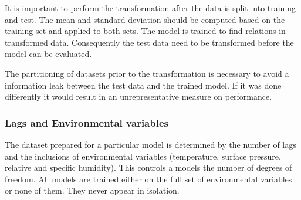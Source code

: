 It is important to perform the transformation after the data is split into training and test. The mean and standard deviation should be computed based on the training set and applied to both sets. The model is trained to find relations in transformed data. Consequently the test data need to be transformed before the model can be evaluated. 

The partitioning of datasets prior to the transformation is necessary to avoid a information leak between the test data and the trained model. If it was done differently it would result in an unrepresentative measure on performance.

 


\subsubsection{Lags and Environmental variables}
The dataset prepared for a particular model is determined by the number of lags and the inclusions of environmental variables (temperature, surface pressure, relative and specific humidity). This controls a models the number of degrees of freedom. All models are trained either on the full set of environmental variables or none of them. They never appear in isolation. 

